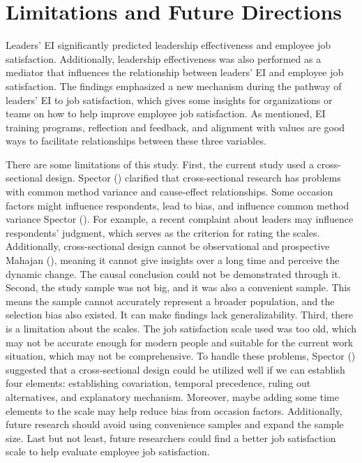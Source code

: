 \documentclass[
  man,
  longtable,
  nolmodern,
  notxfonts,
  notimes,
  colorlinks=true,linkcolor=blue,citecolor=blue,urlcolor=blue]{apa7}
\begin{document}
\section{Limitations and Future
Directions}\label{limitations-and-future-directions}

Leaders' EI significantly predicted leadership effectiveness and
employee job satisfaction. Additionally, leadership effectiveness was
also performed as a mediator that influences the relationship between
leaders' EI and employee job satisfaction. The findings emphasized a new
mechanism during the pathway of leaders' EI to job satisfaction, which
gives some insights for organizations or teams on how to help improve
employee job satisfaction. As mentioned, EI training programs,
reflection and feedback, and alignment with values are good ways to
facilitate relationships between these three variables.

There are some limitations of this study. First, the current study used
a cross-sectional design. Spector ()
clarified that cross-sectional research has problems with common method
variance and cause-effect relationships. Some occasion factors might
influence respondents, lead to bias, and influence common method
variance Spector (). For example, a
recent complaint about leaders may influence respondents' judgment,
which serves as the criterion for rating the scales. Additionally,
cross-sectional design cannot be observational and prospective Mahajan
(), meaning it cannot give insights over
a long time and perceive the dynamic change. The causal conclusion could
not be demonstrated through it. Second, the study sample was not big,
and it was also a convenient sample. This means the sample cannot
accurately represent a broader population, and the selection bias also
existed. It can make findings lack generalizability. Third, there is a
limitation about the scales. The job satisfaction scale used was too
old, which may not be accurate enough for modern people and suitable for
the current work situation, which may not be comprehensive. To handle
these problems, Spector () suggested
that a cross-sectional design could be utilized well if we can establish
four elements: establishing covariation, temporal precedence, ruling out
alternatives, and explanatory mechanism. Moreover, maybe adding some
time elements to the scale may help reduce bias from occasion factors.
Additionally, future research should avoid using convenience samples and
expand the sample size. Last but not least, future researchers could
find a better job satisfaction scale to help evaluate employee job
satisfaction.
\end{document}
